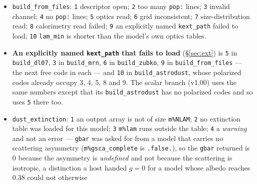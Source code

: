 \documentclass{my_memo}
\newcommand{\code}[1]{\texttt{#1}}
\begin{document}
\begin{itemize}
      \code{4} a population's size distribution could not be formed;
      \code{5} a population's model radii fall outside its optics tables;
      \code{6} a population's \code{hcap/C\_<gtype>.DAT} read failed, or does
      not cover that population's model radii;
      \code{7} a population's \code{oprop/G\_<gtype>.DAT} exists but could not
      be read;
      \code{8} an explicitly named \code{kext\_path} failed to load;
      \code{9} \code{lam\_min} is shorter than the DustEM wavelength grid,
      which this model cannot extend;
      \code{10} a \code{pol} population's \code{oprop/Q1\_<gtype>.DAT} or
      \code{oprop/Q2\_<gtype>.DAT} read failed;
      \code{11} the \code{ALIGN} file of a model with \code{pol} populations
      could not be read, names an alignment model this code does not
      implement, or carries too few laws for its \code{pol} populations
      (\S\ref{sec:g18d-pol}).
\item \code{build\_from\_files}: \code{1} descriptor open;
      \code{2} too many \code{pop:} lines; \code{3} invalid channel;
      \code{4} no \code{pop:} lines; \code{5} optics read;
      \code{6} grid inconsistent; \code{7} size-distribution read;
      \code{8} calorimetry read failed;
      \code{9} an explicitly named \code{kext\_path} failed to load;
      \code{10} \code{lam\_min} is shorter than the model's own optics tables.
\item \textbf{An explicitly named \code{kext\_path} that fails to load}
      (\S\ref{sec:ext}) is \code{5} in \code{build\_dl07}, \code{3} in
      \code{build\_mrn}, \code{6} in
      \code{build\_zubko}, \code{9} in \code{build\_from\_files} --- the next
      free code in each --- and \code{10} in \code{build\_astrodust}, whose
      polarized codes already occupy 3, 4, 5, 8 and 9. The scalar branch
      (v1.00) uses the same numbers except that its \code{build\_astrodust}
      has no polarized codes and so uses \code{5} there too.
\item \code{dust\_extinction}: \code{1} an output array is not of size
      \code{m\%NLAM}; \code{2} no extinction table was loaded for this model;
      \code{3} \code{m\%lam} runs outside the table; \code{4} a \emph{warning}
      and not an error --- \code{gbar} was asked for from a model that
      carries no scattering asymmetry
      (\code{m\%gsca\_complete} is \code{.false.}), so the \code{gbar}
      returned is $0$ because the asymmetry is \emph{undefined} and not
      because the scattering is isotropic, a distinction a host handed
      $g = 0$ for a model whose albedo reaches $0.38$ could not otherwise

\end{itemize}
\end{document}
